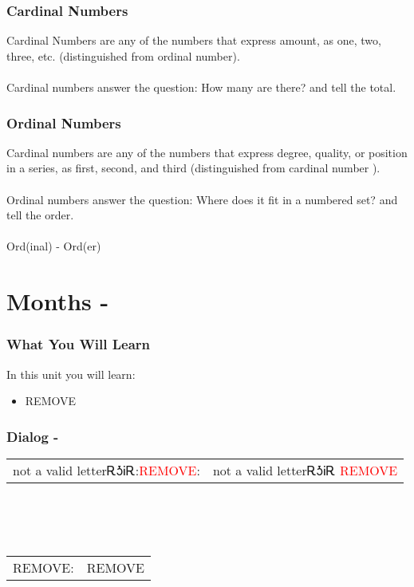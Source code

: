\subsection{Cardinal Numbers}
Cardinal Numbers are any of the numbers that express amount, as one, two, three,  etc. (distinguished from ordinal number).\cite{cardinalNumbers}\\
\\
Cardinal numbers answer the question: How many are there? and tell the total.\subsection{Ordinal Numbers}
Cardinal numbers are any of the numbers that express degree, quality, or position in a series, as first, second, and third  (distinguished from cardinal number ).\cite{ordinalNumbers}\\
\\
Ordinal numbers answer the question: Where does it fit in a numbered set? and tell the order.\\
\\
Ord(inal) - Ord(er)
\index{}
\chapter{Months - }
\subsection{What You Will Learn}
In this unit you will learn:
\begin{itemize}
\item REMOVE
\end{itemize}\newpage

\subsection{Dialog - }
\begin{tabular}{p{2cm} p{11cm}}
not a valid letterᎡᎼᎥᎡ:\newline \textcolor{red}{REMOVE}: & not a valid letterᎡᎼᎥᎡ 
\newline\textcolor{red}{REMOVE}\\
\end{tabular}
\\
\\
\\
\noindent\begin{tabular}{p{2cm} p{11cm}}REMOVE: & REMOVE\\
\end{tabular}
